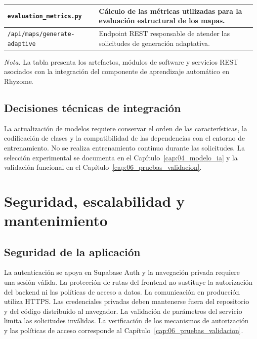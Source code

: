 \begin{table}[htbp]
\begin{tabularx}{\textwidth}{
			|>{\raggedright\arraybackslash}p{5.5cm}|
			>{\raggedright\arraybackslash}X|
		}
		\texttt{evaluation\_\allowbreak metrics.py} &
		Cálculo de las métricas utilizadas para la evaluación estructural de los mapas. \\
		\hline
		
		\texttt{/api/maps/\allowbreak generate-adaptive} &
		Endpoint REST responsable de atender las solicitudes de generación adaptativa. \\
		\hline
		
	\end{tabularx}
	
	\par\smallskip
	\raggedright
	
	\textit{Nota.} La tabla presenta los artefactos, módulos de software y servicios REST asociados con la integración del componente de aprendizaje automático en Rhyzome.
	
\end{table}

\FloatBarrier

\subsection{Decisiones técnicas de integración}
\label{subsec:decisiones_integracion_ia}

La actualización de modelos requiere conservar el orden de las características, la codificación de clases y la compatibilidad de las dependencias con el entorno de entrenamiento. No se realiza entrenamiento continuo durante las solicitudes. La selección experimental se documenta en el Capítulo~\ref{cap:04_modelo_ia} y la validación funcional en el Capítulo~\ref{cap:06_pruebas_validacion}.

\FloatBarrier

\section{Seguridad, escalabilidad y mantenimiento}
\label{sec:seguridad_escalabilidad_mantenimiento}

\subsection{Seguridad de la aplicación}
La autenticación se apoya en Supabase Auth y la navegación privada requiere una sesión válida. La protección de rutas del frontend no sustituye la autorización del backend ni las políticas de acceso a datos. La comunicación en producción utiliza HTTPS. Las credenciales privadas deben mantenerse fuera del repositorio y del código distribuido al navegador. La validación de parámetros del servicio limita las solicitudes inválidas. La verificación de los mecanismos de autorización y las políticas de acceso corresponde al Capítulo~\ref{cap:06_pruebas_validacion}.

